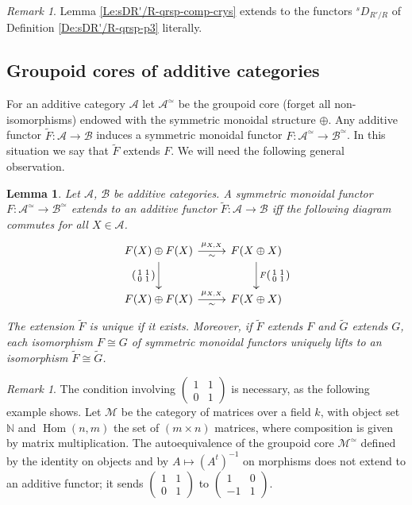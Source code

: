 \documentclass[a4paper,11pt]{amsart}
\theoremstyle{plain}
\newtheorem{Lemma}[equation]{Lemma}
\theoremstyle{definition}
\theoremstyle{remark}
\newtheorem{Remark}[equation]{Remark}
\newcommand{\bLe}{\begin{Lemma}}
\newcommand{\eLe}{\end{Lemma}}
\newcommand{\bRe}{\begin{Remark}}
\newcommand{\eRe}{\end{Remark}}
\numberwithin{equation}{section}
\newcommand{\AAA}{\mathcal{A}}
\newcommand{\BBB}{\mathcal{B}}
\newcommand{\MMM}{\mathcal{M}}
\newcommand{\NN}{{\mathbb{N}}}
\DeclareMathOperator{\Hom}{Hom}
\newcommand{\sD}{{}^{s\!}D}
\begin{document}
\bRe
\label{Re:sDR'/R-qrsp-comp-crys-3}
Lemma \ref{Le:sDR'/R-qrsp-comp-crys} extends to the functors $\sD_{R'/R}$ of Definition \ref{De:sDR'/R-qrsp-p3} literally.
\eRe

\subsection{Groupoid cores of additive categories} 

For an additive category $\AAA$ let $\AAA^\simeq$ be the groupoid core (forget all non-isomorphisms) endowed with the symmetric monoidal structure $\oplus$. Any additive functor $\tilde F\colon \AAA\to\BBB$ induces a symmetric monoidal functor $F\colon \AAA^\simeq\to\BBB^\simeq$. In this situation we say that $\tilde F$ extends $F$.
We will need the following general observation.

\bLe
\label{Le:groupoid-core-extend}
Let $\AAA$, $\BBB$ be additive categories. A symmetric monoidal functor $F\colon \AAA^\simeq\to\BBB^\simeq$ extends to an additive functor $\tilde F\colon \AAA\to\BBB$ iff the following diagram commutes for all $X\in\AAA$. 
\[
\xymatrix@M+0.2em{
F(X)\oplus F(X) \ar[r]_-\sim^-{\mu_{X,X}} \ar[d]_{\left(\begin{smallmatrix}1&1\\0&1\end{smallmatrix}\right)} & F(X\oplus X) \ar[d]^{F\left(\begin{smallmatrix}1&1\\0&1\end{smallmatrix}\right)} \\
F(X)\oplus F(X) \ar[r]_-\sim^-{\mu_{X,X}} & F(X\oplus X) 
}
\]
The extension $\tilde F$ is unique if it exists. Moreover, if $\tilde F$ extends $F$ and $\tilde G$ extends $G$, each isomorphism $F\cong G$ of symmetric monoidal functors uniquely lifts to an isomorphism $\tilde F\cong\tilde G$.
\eLe

\bRe
The condition involving $\left(\begin{smallmatrix}1&1\\0&1\end{smallmatrix}\right)$ is necessary, as the following example shows. Let $\MMM$ be the category of matrices over a field $k$, with object set $\NN$ and $\Hom(n,m)$ the set of $(m\times n)$ matrices, where composition is given by matrix multiplication. The autoequivalence of the groupoid core $\MMM^\simeq$ defined by the identity on objects and by $A\mapsto (A^t)^{-1}$ on morphisms does not extend to an additive functor; it sends $\left(\begin{smallmatrix}1&1\\0&1\end{smallmatrix}\right)$ to $\left(\begin{smallmatrix}1&0\\-1&1\end{smallmatrix}\right)$.
\eRe
\end{document}
